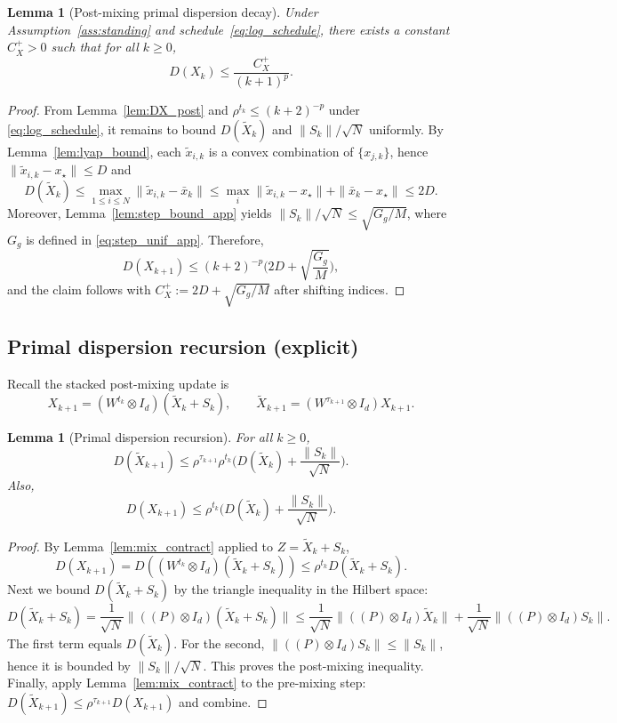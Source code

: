 \documentclass[11pt,a4paper]{article}
\def\one{1}%
\def\J{J}%
\def\Pmat{P}%
\newtheorem{lemma}[theorem]{Lemma}
\newcommand{\one}{\mathbf{1}}
\newcommand{\J}{\left(\frac{1}{N}\one\one^\top\right)}
\newcommand{\Pmat}{I-\J}
\begin{document}
\begin{lemma}[Post-mixing primal dispersion decay]\label{lem:DX_post_decay}
Under Assumption~\ref{ass:standing} and schedule~\eqref{eq:log_schedule}, there exists a constant $C_X^{+}>0$ such that for all $k\ge 0$,
\[
D(X_k)\le \frac{C_X^{+}}{(k+1)^{p}}.
\]
\end{lemma}
\begin{proof}
From Lemma~\ref{lem:DX_post} and $\rho^{t_k}\le (k+2)^{-p}$ under \eqref{eq:log_schedule}, it remains to bound
$D(\tilde X_k)$ and $\|S_k\|/\sqrt N$ uniformly.
By Lemma~\ref{lem:lyap_bound}, each $\tilde x_{i,k}$ is a convex combination of $\{x_{j,k}\}$, hence $\|\tilde x_{i,k}-x_\star\|\le D$ and
\[
D(\tilde X_k)\le \max_{1\le i\le N}\|\tilde x_{i,k}-\bar x_k\|
\le \max_i \|\tilde x_{i,k}-x_\star\|+\|\bar x_k-x_\star\|\le 2D.
\]
Moreover, Lemma~\ref{lem:step_bound_app} yields $\|S_k\|/\sqrt N\le \sqrt{G_g/M}$, where $G_g$ is defined in \eqref{eq:step_unif_app}.
Therefore,
\[
D(X_{k+1})\le (k+2)^{-p}\Big(2D+\sqrt{\frac{G_g}{M}}\Big),
\]
and the claim follows with $C_X^{+}:=2D+\sqrt{G_g/M}$ after shifting indices.
\end{proof}

\subsection{Primal dispersion recursion (explicit)}

Recall the stacked post-mixing update is
\[
X_{k+1}=(W^{t_k}\otimes I_d)(\tilde X_k+S_k),
\qquad
\tilde X_{k+1}=(W^{\tau_{k+1}}\otimes I_d)X_{k+1}.
\]
\begin{lemma}[Primal dispersion recursion]\label{lem:DX_rec}
For all $k\ge0$,
\[
D(\tilde X_{k+1})
\le \rho^{\tau_{k+1}}\rho^{t_k}\Big(D(\tilde X_k)+\frac{\|S_k\|}{\sqrt N}\Big).
\]
Also,
\[
D(X_{k+1})
\le \rho^{t_k}\Big(D(\tilde X_k)+\frac{\|S_k\|}{\sqrt N}\Big).
\]
\end{lemma}
\begin{proof}
By Lemma~\ref{lem:mix_contract} applied to $Z=\tilde X_k+S_k$,
\[
D(X_{k+1})=D((W^{t_k}\otimes I_d)(\tilde X_k+S_k))\le \rho^{t_k}D(\tilde X_k+S_k).
\]
Next we bound $D(\tilde X_k+S_k)$ by the triangle inequality in the Hilbert space:
\[
D(\tilde X_k+S_k)
=\frac1{\sqrt N}\|((\Pmat)\otimes I_d)(\tilde X_k+S_k)\|
\le \frac1{\sqrt N}\|((\Pmat)\otimes I_d)\tilde X_k\|
+\frac1{\sqrt N}\|((\Pmat)\otimes I_d)S_k\|.
\]
The first term equals $D(\tilde X_k)$.
For the second, $\|((\Pmat)\otimes I_d)S_k\|\le \|S_k\|$, hence it is bounded by $\|S_k\|/\sqrt N$.
This proves the post-mixing inequality.
Finally, apply Lemma~\ref{lem:mix_contract} to the pre-mixing step:
$D(\tilde X_{k+1})\le \rho^{\tau_{k+1}}D(X_{k+1})$ and combine.
\end{proof}
\end{document}
